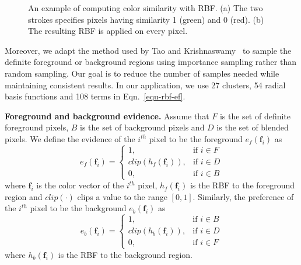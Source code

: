 \begin{figure}
	\centering
	\caption{An example of computing color similarity with RBF. (a) The two strokes specifies pixels having similarity 1 (green) and 0 (red). (b) The resulting RBF is applied on every pixel.}
	\label{fig-image-matting}
\end{figure}

Moreover, we adapt the method used by Tao and Krishnaswamy~\cite{tao2012} to sample the definite foreground or background regions using importance sampling rather than random sampling. Our goal is to reduce the number of samples needed while maintaining consistent results.
In our application, we use 27 clusters, 54 radial basis functions and 108 terms in Eqn.~\ref{equ-rbf-ef}.

\textbf{Foreground and background evidence.}
Assume that $F$ is the set of definite foreground pixels, $B$ is the set of background pixels and $D$ is the set of blended pixels. We define the evidence of the $i^{th}$ pixel to be the foreground $e_{f}(\mathbf{f}_{i})$ as
\begin{equation}
	\label{equ-ef}
	e_{f}(\mathbf{f}_{i})=
		\begin{cases}
			1, & \text{if } i\in F\\
			clip(h_{f}(\mathbf{f}_{i})), & \text{if } i\in D\\
			0, & \text{if } i\in B
		\end{cases}
\end{equation}
where $\mathbf{f}_{i}$ is the color vector of the $i^{th}$ pixel, $h_{f}(\mathbf{f}_{i})$ is the RBF to the foreground region and $clip(\cdot)$ clips a value to the range $[0,1]$. Similarly, the preference of the $i^{th}$ pixel to be the background $e_{b}(\mathbf{f}_{i})$ as
\begin{equation}
	\label{equ-eb}
	e_{b}(\mathbf{f}_{i})=
		\begin{cases}
			1, & \text{if } i\in B\\
			clip(h_{b}(\mathbf{f}_{i})), & \text{if } i\in D\\
			0, & \text{if } i\in F
		\end{cases}
\end{equation}
where $h_{b}(\mathbf{f}_{i})$ is the RBF to the background region.

